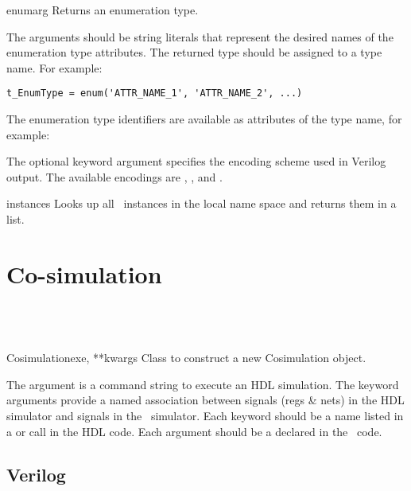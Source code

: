 \begin{funcdesc}{enum}{arg  }
Returns an enumeration type.

The arguments should be string literals that represent the desired
names of the enumeration type attributes.  The returned type should be
assigned to a type name.  For example:
\begin{verbatim}
t_EnumType = enum('ATTR_NAME_1', 'ATTR_NAME_2', ...)
\end{verbatim}
The enumeration type identifiers are available as attributes of
the type name, for example: 

The optional keyword argument  specifies the encoding
scheme used in Verilog output. The available encodings are ,
, and .
\end{funcdesc}

\begin{funcdesc}{instances}{}
Looks up all \myhdl\ instances in the local name space and returns them
in a list.

\end{funcdesc}


\section{Co-simulation\label{ref-cosim}}

\subsection{\myhdl\ \label{ref-cosim-myhdl}}

\begin{classdesc}{Cosimulation}{exe, **kwargs}
Class to construct a new Cosimulation object. 

The  argument is a command string to
execute an HDL simulation. The  keyword
arguments provide a named association between signals
(regs \& nets) in the HDL simulator and signals in the
\myhdl\ simulator. Each keyword should be a name listed
in a  or  call in
the HDL code. Each argument should be a 
declared in the \myhdl\ code.

\end{classdesc}

\subsection{Verilog \label{ref-cosim-verilog}}

